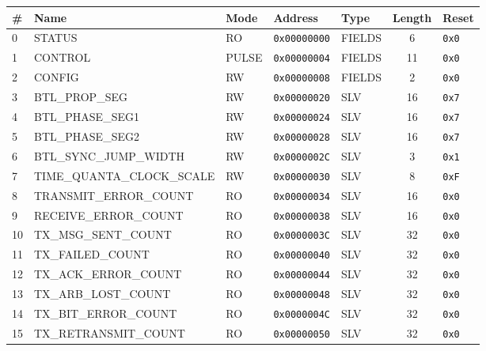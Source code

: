 \documentclass{article}
\begin{document}
\begin{table}[h!]
  \begin{center}
    \label{tab:table1}
    \begin{tabularx}{\linewidth}{|l|X|l|l|l|c|l|}
      \hline
      \textbf{\#} & \textbf{Name} & \textbf{Mode} & \textbf{Address} & \textbf{Type} & \textbf{Length} &
      \textbf{Reset} \\
      \hline
      0 & STATUS & RO & \texttt{0x00000000} & FIELDS & 6 & \texttt{0x0} \\
      \hline
      1 & CONTROL & PULSE & \texttt{0x00000004} & FIELDS & 11 & \texttt{0x0} \\
      \hline
      2 & CONFIG & RW & \texttt{0x00000008} & FIELDS & 2 & \texttt{0x0} \\
      \hline
      3 & BTL{\_}PROP{\_}SEG & RW & \texttt{0x00000020} & SLV & 16 & \texttt{0x7} \\
      \hline
      4 & BTL{\_}PHASE{\_}SEG1 & RW & \texttt{0x00000024} & SLV & 16 & \texttt{0x7} \\
      \hline
      5 & BTL{\_}PHASE{\_}SEG2 & RW & \texttt{0x00000028} & SLV & 16 & \texttt{0x7} \\
      \hline
      6 & BTL{\_}SYNC{\_}JUMP{\_}WIDTH & RW & \texttt{0x0000002C} & SLV & 3 & \texttt{0x1} \\
      \hline
      7 & TIME{\_}QUANTA{\_}CLOCK{\_}SCALE & RW & \texttt{0x00000030} & SLV & 8 & \texttt{0xF} \\
      \hline
      8 & TRANSMIT{\_}ERROR{\_}COUNT & RO & \texttt{0x00000034} & SLV & 16 & \texttt{0x0} \\
      \hline
      9 & RECEIVE{\_}ERROR{\_}COUNT & RO & \texttt{0x00000038} & SLV & 16 & \texttt{0x0} \\
      \hline
      10 & TX{\_}MSG{\_}SENT{\_}COUNT & RO & \texttt{0x0000003C} & SLV & 32 & \texttt{0x0} \\
      \hline
      11 & TX{\_}FAILED{\_}COUNT & RO & \texttt{0x00000040} & SLV & 32 & \texttt{0x0} \\
      \hline
      12 & TX{\_}ACK{\_}ERROR{\_}COUNT & RO & \texttt{0x00000044} & SLV & 32 & \texttt{0x0} \\
      \hline
      13 & TX{\_}ARB{\_}LOST{\_}COUNT & RO & \texttt{0x00000048} & SLV & 32 & \texttt{0x0} \\
      \hline
      14 & TX{\_}BIT{\_}ERROR{\_}COUNT & RO & \texttt{0x0000004C} & SLV & 32 & \texttt{0x0} \\
      \hline
      15 & TX{\_}RETRANSMIT{\_}COUNT & RO & \texttt{0x00000050} & SLV & 32 & \texttt{0x0} \\

\end{tabularx}
\end{center}
\end{table}
\end{document}
